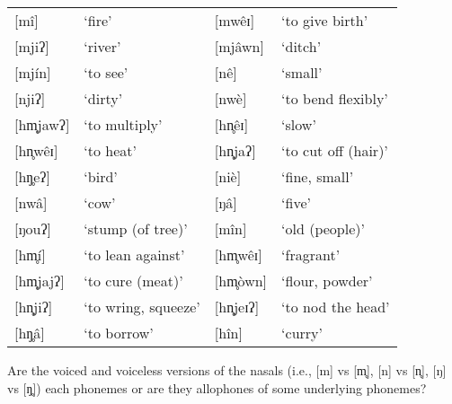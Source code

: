 \documentclass[addpoints]{exam}
\begin{document}
\begin{questions}
      \newpage


        \begin{tabular}{l l l l}
          {[}mî]     & `fire'              & [mwêɪ]  & `to give birth' \\
          {[}mjiʔ]   & `river'             & [mjâwn]  & `ditch' \\
          {[}mjín]   & `to see'            & [nê]     & `small' \\
          {[}njiʔ]   & `dirty'             & [nwè]    & `to bend flexibly' \\
          {[}hm̥jawʔ] & `to multiply'       & [hn̥êɪ]   & `slow' \\
          {[}hn̥wêɪ]  & `to heat'           & [hn̥jaʔ]  & `to cut off (hair)' \\
          {[}hŋ̥eʔ]   & `bird'              & [niè]    & `fine, small' \\
          {[}nwâ]    & `cow'               & [ŋâ]     & `five' \\
          {[}ŋouʔ]   & `stump (of tree)'   & [mîn]    & `old (people)' \\
          {[}hm̥í]    & `to lean against'   & [hm̥wêɪ]  & `fragrant' \\
          {[}hm̥jajʔ] & `to cure (meat)'    & [hm̥òwn]  & `flour, powder' \\
          {[}hn̥jiʔ]  & `to wring, squeeze' & [hn̥jeɪʔ] & `to nod the head' \\
          {[}hŋ̥â]    & `to borrow'         & [hîn]    & `curry'
        \end{tabular}

        \question[1] Are the voiced and voiceless versions of the nasals (i.e., [m] vs [m̥], [n] vs [n̥], [ŋ] vs [ŋ̥]) each phonemes or are they allophones of some underlying phonemes? \hrulefill


\end{questions}
\end{document}
